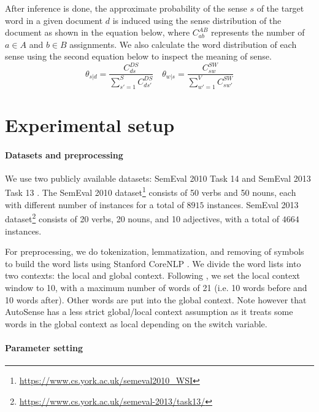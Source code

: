 \documentclass[letterpaper]{article} %
\begin{document}
After inference is done, the approximate probability of the sense $s$ of the target word in a given document $d$ is induced using the sense distribution of the document as shown in the equation below, where $C^{AB}_{ab}$ represents the number of $a \in A$ and $b \in B$ assignments. We also calculate the word distribution of each sense using the second equation below to inspect the meaning of sense.
%
\begin{equation}
    \label{eq:induction}
    \theta_{s|d} = \frac{C^{DS}_{ds}}{\sum^S_{s'=1}C^{DS}_{ds'}}
    \quad
	\theta_{w|s} = \frac{C^{SW}_{sw}}{\sum^{V}_{w'=1}C^{SW}_{sw'}}
\end{equation}
%
\section{Experimental setup} %

\paragraph{Datasets and preprocessing}

We use two publicly available datasets: SemEval 2010 Task 14 \cite{manandhar2010semeval} and SemEval 2013 Task 13 \cite{jurgens2013semeval}. The SemEval 2010 dataset\footnote{\url{https://www.cs.york.ac.uk/semeval2010_WSI}} consists of 50 verbs and 50 nouns, each with different number of instances for a total of $8915$ instances. SemEval 2013 dataset\footnote{\url{https://www.cs.york.ac.uk/semeval-2013/task13/}} consists of 20 verbs, 20 nouns, and 10 adjectives, with a total of $4664$ instances.

For preprocessing, we do tokenization, lemmatization, and removing of symbols to build the word lists using Stanford CoreNLP \cite{manning2014stanford}. We divide the word lists into two contexts: the local and global context. Following \cite{wang2015sense}, we set the local context window to 10, with a maximum number of words of 21 (i.e. 10 words before and 10 words after). Other words are put into the global context. Note however that AutoSense has a less strict global/local context assumption as it treats some words in the global context as local depending on the switch variable.

\paragraph{Parameter setting}
\end{document}
